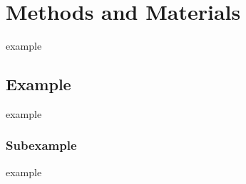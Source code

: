 \chapter{Methods and Materials} \label{chap:methods}

example

\section{Example}

example 


\subsection{Subexample}

example 

